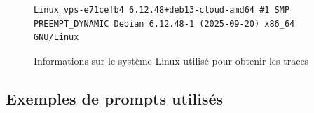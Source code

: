 \documentclass[letterpaper, 10 pt, conference]{ieeeconf}  %
\begin{document}
\begin{figure}[htbp]
\centering
\begin{minipage}{\columnwidth}
\begin{lstlisting}[style=bashstyle, frame=single]
Linux vps-e71cefb4 6.12.48+deb13-cloud-amd64 #1 SMP PREEMPT_DYNAMIC Debian 6.12.48-1 (2025-09-20) x86_64 GNU/Linux
\end{lstlisting}
\end{minipage}
\caption{Informations sur le système Linux utilisé pour obtenir les traces}
\label{fig:uname}
\end{figure}

\subsection*{Exemples de prompts utilisés}
\end{document}
